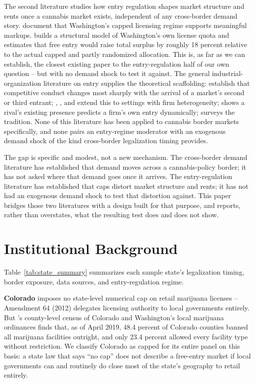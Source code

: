 \documentclass[12pt]{article}
\begin{document}
The second literature studies how entry regulation shapes market structure and rents once a cannabis market
exists, independent of any cross-border demand story. \citet{HollenbeckUetake2021} document that Washington's
capped licensing regime supports meaningful markups. \citet{Thomas2019LicenseQuotas} builds a structural model
of Washington's own license quota and estimates that free entry would raise total surplus by roughly 18
percent relative to the actual capped and partly randomized allocation. This is, as far as we can establish,
the closest existing paper to the entry-regulation half of our own question -- but with no demand shock to
test it against. The general industrial-organization literature on entry supplies the theoretical scaffolding:
\citet{BresnahanReiss1990,BresnahanReiss1991} establish that competitive conduct changes most sharply with the
arrival of a market's second or third entrant; \citet{Berry1992}, \citet{Mazzeo2002}, and \citet{Seim2006}
extend this to settings with firm heterogeneity; \citet{ToivanenWaterson2005} shows a rival's existing
presence predicts a firm's own entry dynamically; \citet{BerryReiss2007} surveys the tradition. None of this
literature has been applied to cannabis border markets specifically, and none pairs an entry-regime moderator
with an exogenous demand shock of the kind cross-border legalization timing provides.

The gap is specific and modest, not a new mechanism. The cross-border demand literature has established that
demand moves across a cannabis-policy border; it has not asked where that demand goes once it arrives. The
entry-regulation literature has established that caps distort market structure and rents; it has not had an
exogenous demand shock to test that distortion against. This paper bridges those two literatures with a
design built for that purpose, and reports, rather than overstates, what the resulting test does and does not
show.

\section{Institutional Background}
\label{sec:institutional}



Table~\ref{tab:state_summary} summarizes each sample state's legalization timing, border exposure, data
sources, and entry-regulation regime.

\textbf{Colorado} imposes no state-level numerical cap on retail marijuana licenses -- Amendment 64 (2012)
delegates licensing authority to local governments entirely. But \citet{PayanBrownSong2021}'s county-level
census of Colorado and Washington's local marijuana ordinances finds that, as of April 2019, 48.4 percent of
Colorado counties banned all marijuana facilities outright, and only 23.4 percent allowed every facility type
without restriction. We classify Colorado as capped for its entire panel on this basis: a state law that says
``no cap'' does not describe a free-entry market if local governments can and routinely do close most of the
state's geography to retail entirely.
\end{document}
